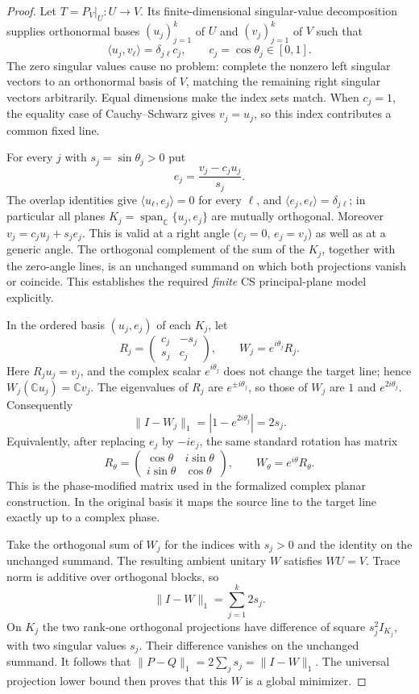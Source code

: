 \begin{tcolorbox}
\begin{proof}
Let $T=P_V|_U:U\to V$. Its finite-dimensional singular-value
decomposition supplies orthonormal bases $(u_j)_{j=1}^k$ of $U$ and
$(v_j)_{j=1}^k$ of $V$ such that
\[
 \langle u_j,v_\ell\rangle=\delta_{j\ell}c_j,
 \qquad c_j=\cos\theta_j\in[0,1].
\]
The zero singular values cause no problem: complete the nonzero left
singular vectors to an orthonormal basis of $V$, matching the remaining
right singular vectors arbitrarily. Equal dimensions make the index sets
match. When $c_j=1$, the equality case of Cauchy--Schwarz gives
$v_j=u_j$, so this index contributes a common fixed line.

For every $j$ with $s_j=\sin\theta_j>0$ put
\[
 e_j=\frac{v_j-c_j u_j}{s_j}.
\]
The overlap identities give
$\langle u_\ell,e_j\rangle=0$ for every $\ell$,
and $\langle e_j,e_\ell\rangle=\delta_{j\ell}$; in particular all
planes $K_j=\operatorname{span}_{\mathbb C}\{u_j,e_j\}$ are mutually
orthogonal. Moreover $v_j=c_j u_j+s_j e_j$. This is valid at a
right angle ($c_j=0$, $e_j=v_j$) as well as at a generic angle.
The orthogonal complement of the sum of the $K_j$, together with the
zero-angle lines, is an unchanged summand on which both projections
vanish or coincide. This establishes the required \emph{finite} CS
principal-plane model explicitly.

In the ordered basis $(u_j,e_j)$ of each $K_j$, let
\[
 R_j=\begin{pmatrix}c_j&-s_j\\s_j&c_j\end{pmatrix},
 \qquad W_j=e^{i\theta_j}R_j.
\]
Here $R_ju_j=v_j$, and the complex scalar $e^{i\theta_j}$ does not
change the target line; hence $W_j(\mathbb C u_j)=\mathbb C v_j$.
The eigenvalues of $R_j$ are $e^{\pm i\theta_j}$, so those of $W_j$
are $1$ and $e^{2i\theta_j}$. Consequently
\[
 \|I-W_j\|_1=|1-e^{2i\theta_j}|=2s_j.
\]
Equivalently, after replacing $e_j$ by $-ie_j$, the same standard rotation
has matrix
\begin{equation}
 R_\theta=\begin{pmatrix}
   \cos\theta&i\sin\theta\\ i\sin\theta&\cos\theta
 \end{pmatrix},
 \qquad W_\theta=e^{i\theta}R_\theta.
 \label{eq:draft-complex-phase}
\end{equation}
This is the phase-modified matrix used in the formalized complex planar
construction. In the original basis it maps the source line to the target
line exactly up to a complex phase.

Take the orthogonal sum of $W_j$ for the indices with $s_j>0$ and the
identity on the unchanged summand. The resulting ambient unitary $W$
satisfies $WU=V$. Trace norm is additive over orthogonal blocks, so
\[
 \|I-W\|_1=\sum_{j=1}^k2s_j.
\]
On $K_j$ the two rank-one orthogonal projections have difference of
square $s_j^2I_{K_j}$, with two singular values $s_j$. Their difference
vanishes on the unchanged summand. It follows that
$\|P-Q\|_1=2\sum_js_j=\|I-W\|_1$. The universal projection lower bound
then proves that this $W$ is a global minimizer.
\end{proof}


\end{tcolorbox}
